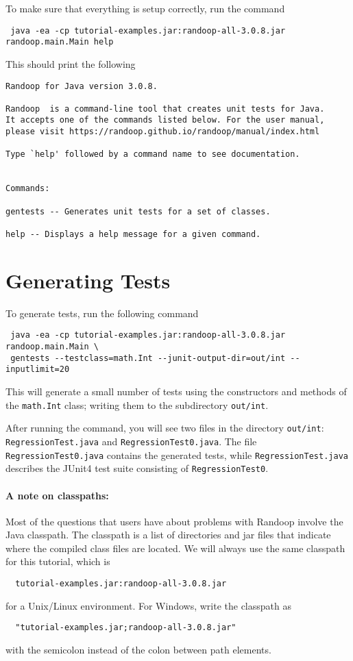 \documentclass[11pt, oneside]{article} %
\begin{document}
To make sure that everything is setup correctly, run the command
\begin{verbatim}
 java -ea -cp tutorial-examples.jar:randoop-all-3.0.8.jar randoop.main.Main help
\end{verbatim}
This should print the following
\begin{verbatim}
Randoop for Java version 3.0.8.

Randoop  is a command-line tool that creates unit tests for Java.
It accepts one of the commands listed below. For the user manual,
please visit https://randoop.github.io/randoop/manual/index.html

Type `help' followed by a command name to see documentation.


Commands:

gentests -- Generates unit tests for a set of classes.

help -- Displays a help message for a given command.
\end{verbatim}



\section{Generating Tests}
To generate tests, run the following command 
\begin{verbatim}
 java -ea -cp tutorial-examples.jar:randoop-all-3.0.8.jar randoop.main.Main \
 gentests --testclass=math.Int --junit-output-dir=out/int --inputlimit=20
\end{verbatim}
This will generate a small number of tests using the constructors and methods of the \texttt{math.Int} class; writing them to the subdirectory \texttt{out/int}.

After running the command, you will see two files in the directory \texttt{out/int}:
 \texttt{RegressionTest.java} and \texttt{RegressionTest0.java}.
The file \texttt{RegressionTest0.java} contains the generated tests, while  \texttt{RegressionTest.java}  describes the JUnit4 test suite consisting of  \texttt{RegressionTest0}.

\paragraph{A note on classpaths:} 
Most of the questions that users have about problems with Randoop involve the Java classpath.
The classpath is a list of directories and jar files that indicate where the compiled class files are located.
We will always use the same classpath for this tutorial, which is
\begin{verbatim}
  tutorial-examples.jar:randoop-all-3.0.8.jar
\end{verbatim}
for a Unix/Linux environment.
For Windows, write the classpath as
\begin{verbatim}
  "tutorial-examples.jar;randoop-all-3.0.8.jar"
\end{verbatim}
with the semicolon instead of the colon between path elements.
\end{document}
